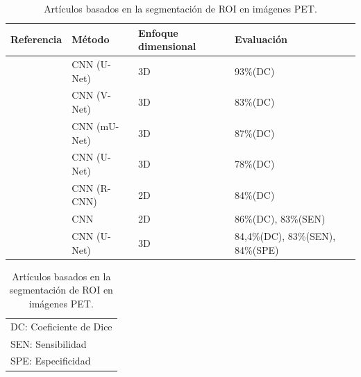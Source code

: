 \documentclass[11pt,a4paper,openany]{article}
\begin{document}
        \begin{table}[H]
            \caption{Artículos basados en la segmentación de ROI en imágenes PET.\label{tab:petSegRef}}
            \begin{center}
            \begin{tabular}{p{3.5cm} p{4cm} p{2.3cm} p{3cm}}
            \hline
            \bf{Referencia} & \bf{Método} & \bf{Enfoque dimensional} & \bf{Evaluación}\\ 
            \hline
            \cite{Theophraste2018} & CNN (U-Net) & 3D & 93\%(DC) \\
            \hline
            \cite{Zhao2018} & CNN (V-Net) & 3D & 83\%(DC) \\
            \hline
            \cite{Leung2020} & CNN (mU-Net) & 3D & 87\%(DC) \\
            \hline
            \cite{Park2022} & CNN (U-Net) & 3D & 78\%(DC) \\
            \hline
            \cite{Lei2022} & CNN (R-CNN) & 2D & 84\%(DC) \\
            \hline
            \cite{Xia2023} & CNN & 2D & 86\%(DC), 83\%(SEN) \\
            \hline
            \cite{Yu2023} & CNN (U-Net) & 3D & 84,4\%(DC), 83\%(SEN), 84\%(SPE) \\
            \hline
            \end{tabular}
            \end{center}
            \begin{tabular}{l}
            \footnotesize DC: Coeficiente de Dice \\
            \footnotesize SEN: Sensibilidad \\
            \footnotesize SPE: Especificidad \\
            \end{tabular}
        \end{table}
\end{document}

